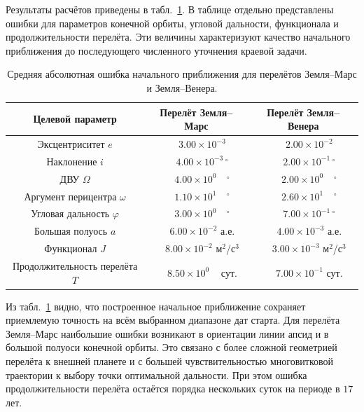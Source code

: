 Результаты расчётов приведены в табл.~\ref{tab:chap4_initial_guess_errors}. В таблице отдельно представлены ошибки для параметров конечной орбиты, угловой дальности, функционала и продолжительности перелёта. Эти величины характеризуют качество начального приближения до последующего численного уточнения краевой задачи.

\begin{table}[htbp]
	\centering
	\caption{Средняя абсолютная ошибка начального приближения для перелётов Земля--Марс и Земля--Венера.}
	\label{tab:chap4_initial_guess_errors}
	\begin{tabular}{ccc}
		\toprule
		Целевой параметр &
		Перелёт Земля--Марс &
		Перелёт Земля--Венера \\
		\midrule
		Эксцентриситет \(e\) &
		\(\phantom{-}3.00\times10^{-3}\) &
		\(\phantom{-}2.00\times10^{-2}\) \\
		Наклонение \(i\) &
		\(\phantom{-}4.00\times10^{-3}\,{}^\circ\) &
		\(\phantom{-}2.00\times10^{-1}\,{}^\circ\) \\
		ДВУ \(\Omega\) &
		\(\phantom{-}4.00\times10^{0\phantom{-}}\,{}^\circ\) &
		\(\phantom{-}2.00\times10^{0\phantom{-}}\,{}^\circ\) \\
		Аргумент перицентра \(\omega\) &
		\(\phantom{-}1.10\times10^{1\phantom{-}}\,{}^\circ\) &
		\(\phantom{-}2.60\times10^{1\phantom{-}}\,{}^\circ\) \\
		Угловая дальность \(\varphi\) &
		\(\phantom{-}3.00\times10^{0\phantom{-}}\,{}^\circ\) &
		\(\phantom{-}7.00\times10^{-1}\,{}^\circ\) \\
		Большая полуось \(a\) &
		\(\phantom{-}6.00\times10^{-2}\) а.е. &
		\(\phantom{-}4.00\times10^{-3}\) а.е. \\
		Функционал \(J\) &
		\(\phantom{-}8.00\times10^{-2}\) м\(^2\)/с\(^3\) &
		\(\phantom{-}3.00\times10^{-3}\) м\(^2\)/с\(^3\) \\
		Продолжительность перелёта \(T\) &
		\(\phantom{-}8.50\times10^{0\phantom{-}}\) сут. &
		\(\phantom{-}7.00\times10^{-1}\) сут. \\
		\bottomrule
	\end{tabular}
\end{table}

Из табл.~\ref{tab:chap4_initial_guess_errors} видно, что построенное начальное приближение сохраняет приемлемую точность на всём выбранном диапазоне дат старта. Для перелёта Земля--Марс наибольшие ошибки возникают в ориентации линии апсид и в большой полуоси конечной орбиты. Это связано с более сложной геометрией перелёта к внешней планете и с большей чувствительностью многовитковой траектории к выбору точки оптимальной дальности. При этом ошибка продолжительности перелёта остаётся порядка нескольких суток на периоде в \(17\) лет.

